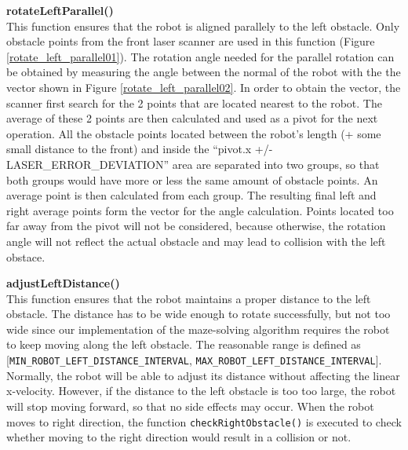 \begin{description}
\item \textbf{rotateLeftParallel()} \label{item:rotateLeftParallel} \hfill \\
This function ensures that the robot is aligned parallely to the left obstacle. Only obstacle points from the front laser scanner are used in this function (Figure \ref{rotate_left_parallel01}). The rotation angle needed for the parallel rotation can be obtained by measuring the angle between the normal of the robot with the the vector shown in Figure \ref{rotate_left_parallel02}. In order to obtain the vector, the scanner first search for the 2 points that are located nearest to the robot. The average of these 2 points are then calculated and used as a pivot for the next operation. All the obstacle points located between the robot's length (+ some small distance to the front) and inside the ``pivot.x +/- LASER\_ERROR\_DEVIATION'' area are separated into two groups, so that both groups would have more or less the same amount of obstacle points. An average point is then calculated from each group. The resulting final left and right average points form the vector for the angle calculation. Points located too far away from the pivot will not be considered, because otherwise, the rotation angle will not reflect the actual obstacle and may lead to collision with the left obstace.

\item \textbf{adjustLeftDistance()} \label{item:adjustLeftDistance} \hfill \\
This function ensures that the robot maintains a proper distance to the left obstacle. The distance has to be wide enough to rotate successfully, but not too wide since our implementation of the maze-solving algorithm requires the robot to keep moving along the left obstacle. The reasonable range is defined as [\texttt{MIN\_ROBOT\_LEFT\_DISTANCE\_INTERVAL}, \texttt{MAX\_ROBOT\_LEFT\_DISTANCE\_INTERVAL}]. Normally, the robot will be able to adjust its distance without affecting the linear x-velocity. However, if the distance to the left obstacle is too too large, the robot will stop moving forward, so that no side effects may occur. When the robot moves to right direction, the function \texttt{checkRightObstacle()} is executed to check whether moving to the right direction would result in a collision or not. 


\end{description}
